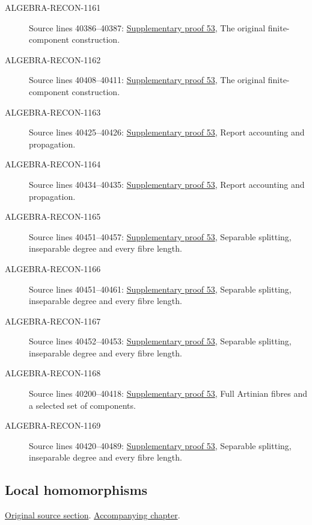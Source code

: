 \begin{description}
\item[ALGEBRA-RECON-1161] Source lines 40386--40387: \hyperlink{algebra_etale_quasifinite_notes_20260928}{Supplementary proof 53}, The original finite-component construction.
\item[ALGEBRA-RECON-1162] Source lines 40408--40411: \hyperlink{algebra_etale_quasifinite_notes_20260928}{Supplementary proof 53}, The original finite-component construction.
\item[ALGEBRA-RECON-1163] Source lines 40425--40426: \hyperlink{algebra_etale_quasifinite_notes_20260928}{Supplementary proof 53}, Report accounting and propagation.
\item[ALGEBRA-RECON-1164] Source lines 40434--40435: \hyperlink{algebra_etale_quasifinite_notes_20260928}{Supplementary proof 53}, Report accounting and propagation.
\item[ALGEBRA-RECON-1165] Source lines 40451--40457: \hyperlink{algebra_etale_quasifinite_notes_20260928}{Supplementary proof 53}, Separable splitting, inseparable degree and every fibre length.
\item[ALGEBRA-RECON-1166] Source lines 40451--40461: \hyperlink{algebra_etale_quasifinite_notes_20260928}{Supplementary proof 53}, Separable splitting, inseparable degree and every fibre length.
\item[ALGEBRA-RECON-1167] Source lines 40452--40453: \hyperlink{algebra_etale_quasifinite_notes_20260928}{Supplementary proof 53}, Separable splitting, inseparable degree and every fibre length.
\item[ALGEBRA-RECON-1168] Source lines 40200--40418: \hyperlink{algebra_etale_quasifinite_notes_20260928}{Supplementary proof 53}, Full Artinian fibres and a selected set of components.
\item[ALGEBRA-RECON-1169] Source lines 40420--40489: \hyperlink{algebra_etale_quasifinite_notes_20260928}{Supplementary proof 53}, Separable splitting, inseparable degree and every fibre length.
\end{description}

\subsection{Local homomorphisms}
\hypertarget{algebra-source-section-local-homomorphisms}{}
\noindent\href{https://github.com/stacks/stacks-project/blob/a04446e57ec1fbc252a871afcec7752fb2807b14/algebra.tex\#L40497}{Original source section}. \href{algebra.pdf\#nameddest=section-local-homomorphisms}{Accompanying chapter}.

